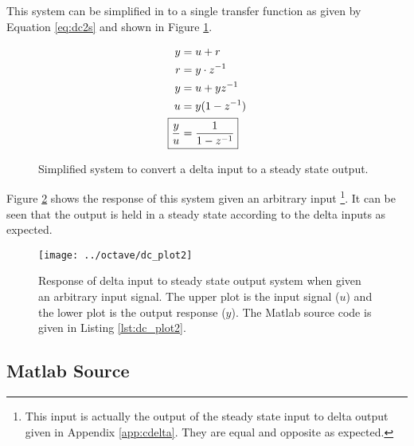 \documentclass{article}
\begin{document}
This system can be simplified in to a single transfer function
as given by Equation \ref{eq:dc2s} and shown in Figure \ref{fig:dc1s}.

\begin{align}
	y &= u + r \notag \\
	r &= y \cdot z^{-1} \notag \\
	y &= u + y z^{-1} \notag \\
	u &= y(1 - z^{-1}) \notag \\
	\Aboxed{ \frac{y}{u} &= \frac{1}{1 - z^{-1}} } \label{eq:dc2s}
\end{align}

\begin{figure}[!htbp]
\begin{center}


\end{center}
\caption{Simplified system to convert a delta input to
a steady state output.}
\label{fig:dc1s}
\end{figure}

Figure \ref{fig:dc_plot2} shows the response of this system given
an arbitrary input
\footnote{This input is actually the output of the steady state input
to delta output given in Appendix \ref{app:cdelta}.
They are equal and opposite as expected.}.
It can be seen that the output is held in a steady state according
to the delta inputs as expected.

\begin{figure}[htbp!]
\texttt{[image: ../octave/dc\_plot2]}
\caption{Response of delta input to steady state output system
when given an arbitrary input signal.
The upper plot is the input signal ($u$) and the lower plot is
the output response ($y$).
The Matlab source code is given in Listing \ref{lst:dc_plot2}.
}
\label{fig:dc_plot2}
\end{figure}

\clearpage
\subsection{Matlab Source}
\label{app:dcsrc}

\nocite{octave}
\end{document}

